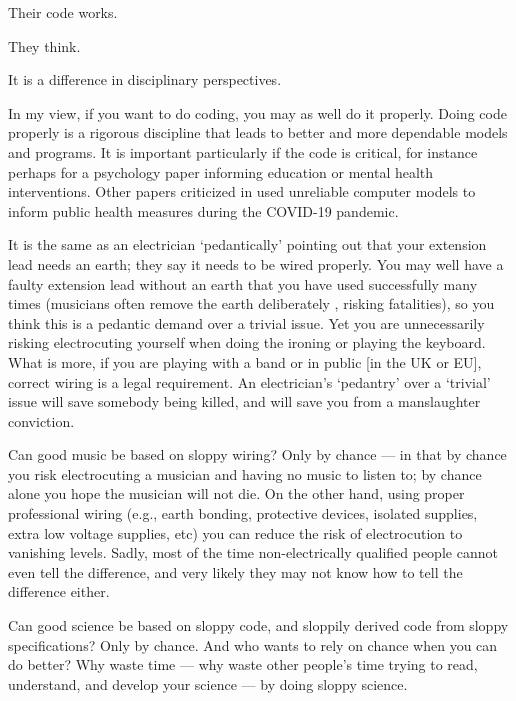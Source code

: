 \documentclass[11pt]{article}
\begin{document}
Their code works. 

They think.

It is a difference in disciplinary perspectives. 

In my view, if you want to do coding, you may as well do it properly. Doing code properly is a rigorous discipline that leads to better and more dependable models and programs. It is important particularly if the code is critical, for instance perhaps for a psychology paper informing education or mental health interventions. Other papers criticized in \cite{harold-cj} used unreliable computer models to inform public health measures during the COVID-19 pandemic.

It is the same as an electrician `pedantically' pointing out that your extension lead needs an earth; they say it needs to be wired properly. You may well have a faulty extension lead without an earth that you have used successfully many times (musicians often remove the earth deliberately \cite{earthlift}, risking fatalities), so you think this is a pedantic demand over a trivial issue. Yet you are unnecessarily risking electrocuting yourself when doing the ironing or playing the keyboard. What is more, if you are playing with a band or in public [in the UK or EU], correct wiring is a legal requirement. An electrician's `pedantry' over a `trivial' issue will save somebody being killed, and will save you from a manslaughter conviction.

Can good music be based on sloppy wiring? Only by chance --- in that by chance you risk electrocuting a musician and having no music to listen to; by chance alone you hope the musician will not die. On the other hand, using proper professional wiring (e.g., earth bonding, protective devices, isolated supplies, extra low voltage supplies, etc) you can reduce the risk of electrocution to vanishing levels. Sadly, most of the time non-electrically qualified people cannot even tell the difference, and very likely they may not know how to tell the difference either. 

Can good science be based on sloppy code, and sloppily derived code from sloppy specifications? Only by chance. And who wants to rely on chance when you can do better? Why waste time --- why waste other people's time trying to read, understand, and develop your science --- by doing sloppy science.
\end{document}
